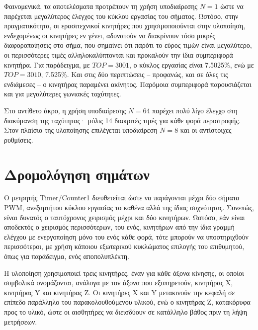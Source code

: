 Φαινομενικά, τα αποτελέσματα προτρέπουν τη χρήση υποδιαίρεσης $N = 1$ ώστε να
παρέχεται μεγαλύτερος έλεγχος του κύκλου εργασίας του σήματος. Ωστόσο, στην
πραγματικότητα, οι ερασιτεχνικοί κινητήρες που χρησιμοποιούνται στην υλοποίηση,
ενδεχομένως οι κινητήρες εν γένει, αδυνατούν να διακρίνουν τόσο μικρές
διαφοροποίησεις στο σήμα, που σημαίνει ότι παρότι το εύρος τιμών είναι
μεγαλύτερο, οι περισσότερες τιμές αλληλοκαλύπτονται και προκαλούν την ίδια
συμπεριφορά κινητήρα. Για παράδειγμα, με $TOP = 3001$, ο κύκλος εργασίας είναι
7.5025\%, ενώ με $TOP = 3010$, 7.525\%. Και στις δύο περιπτώσεις -- προφανώς,
και σε όλες τις ενδιάμεσες -- ο κινητήρας παραμένει ακίνητος. Παρόμοια
συμπεριφορά παρουσιάζεται και για μεγαλύτερες γωνιακές ταχύτητες.

Στο αντίθετο άκρο, η χρήση υποδιαίρεσης $N = 64$ παρέχει πολύ λίγο έλεγχο στη
διακύμανση της ταχύτητας· μόλις 14 διακριτές τιμές για κάθε φορά περιστροφής.
Στον πλαίσιο της υλοποίησης επιλέγεται υποδιαίρεση $N = 8$ και οι αντίστοιχες
ρυθμίσεις.



\section{Δρομολόγηση σημάτων}
\label{sec:motor:routing}

%

Ο μετρητής \textenglish{Timer\slash Counter1} διευθετείται ώστε να παράγονται
μέχρι δύο σήματα PWM, ανεξαρτήτου κύκλου εργασίας το καθένα αλλά της ίδιας
συχνότητας. Συνεπώς, είναι δυνατός ο ταυτόχρονος χειρισμός μέχρι και δύο
κινητήρων. Ωστόσο, εάν είναι αποδεκτός ο χειρισμός περισσότερων, του ενός,
κινητήρων από την ίδια γραμμή ελέγχου με ενεργοποίηση μόνο του ενός κάθε φορά,
τότε μπορούν να υποστηριχθούν περισσότεροι, με χρήση κάποιου εξωτερικού
κυκλώματος επιλογής του επιθυμητού, όπως για παράδειγμα, ενός αποπολυπλέκτη.

Η υλοποίηση χρησιμοποιεί τρεις κινητήρες, έναν για κάθε άξονα κίνησης, οι οποίοι
συμβολικά ονομάζονται, ανάλογα με τον άξονα που εξυπηρετούν, κινητήρας X,
κινητήρας Y και κινητήρας Z. Οι κινητήρες X και Y μετακινούν την κεφαλή σε
επίπεδο παράλληλο του παρακολουθούμενου υλικού, ενώ ο κινητήρας Z, κατακόρυφα
προς το υλικό, ώστε οι αισθητήρες να διεισδύουν σε κατάλληλο βάθος πριν τη λήψη
μετρήσεων.

